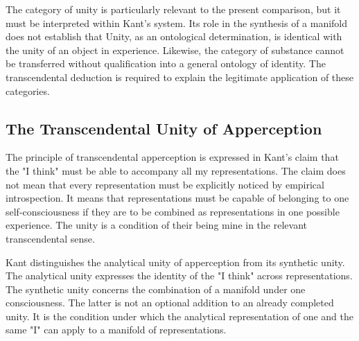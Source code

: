 \label{para:VS.B01.P01.C08.S10.SS04.P005}

The category of unity is particularly relevant to
the present comparison, but it must be interpreted
within Kant's system. Its role in the synthesis of
a manifold does not establish that Unity, as an
ontological determination, is identical with the
unity of an object in experience. Likewise, the
category of substance cannot be transferred without
qualification into a general ontology of identity.
The transcendental deduction is required to explain
the legitimate application of these categories.



\subsection{The Transcendental Unity of Apperception}
\label{subsec:ch08-kant-apperception}

\label{para:VS.B01.P01.C08.S10.SS05.P001}

The principle of transcendental apperception is
expressed in Kant's claim that the "I think" must
be able to accompany all my representations. The
claim does not mean that every representation must
be explicitly noticed by empirical introspection.
It means that representations must be capable of
belonging to one self-consciousness if they are
to be combined as representations in one possible
experience. The unity is a condition of their
being mine in the relevant transcendental sense.
\cite[B131--B132]{KantCritiquePureReason}

\label{para:VS.B01.P01.C08.S10.SS05.P002}

Kant distinguishes the analytical unity of
apperception from its synthetic unity. The analytical
unity expresses the identity of the "I think" across
representations. The synthetic unity concerns the
combination of a manifold under one consciousness.
The latter is not an optional addition to an already
completed unity. It is the condition under which
the analytical representation of one and the same
"I" can apply to a manifold of representations.
\cite[B133--B135]{KantCritiquePureReason}

